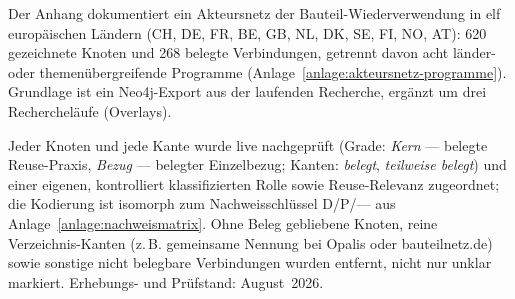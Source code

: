 \label{anlage:akteursnetz}

Der Anhang dokumentiert ein Akteursnetz der Bauteil-Wiederverwendung in elf europäischen Ländern (CH, DE, FR, BE, GB, NL, DK, SE, FI, NO, AT): 620 gezeichnete Knoten und 268 belegte Verbindungen, getrennt davon acht länder- oder themenübergreifende Programme (Anlage~\ref{anlage:akteursnetz-programme}). Grundlage ist ein Neo4j-Export aus der laufenden Recherche, ergänzt um drei Rechercheläufe (Overlays).

Jeder Knoten und jede Kante wurde live nachgeprüft (Grade: \emph{Kern} — belegte Reuse-Praxis, \emph{Bezug} — belegter Einzelbezug; Kanten: \emph{belegt}, \emph{teilweise belegt}) und einer eigenen, kontrolliert klassifizierten Rolle sowie Reuse-Relevanz zugeordnet; die Kodierung ist isomorph zum Nachweisschlüssel D/P/— aus Anlage~\ref{anlage:nachweismatrix}. Ohne Beleg gebliebene Knoten, reine Verzeichnis-Kanten (z.\,B. gemeinsame Nennung bei Opalis oder bauteilnetz.de) sowie sonstige nicht belegbare Verbindungen wurden entfernt, nicht nur unklar markiert. Erhebungs- und Prüfstand: August~2026.






